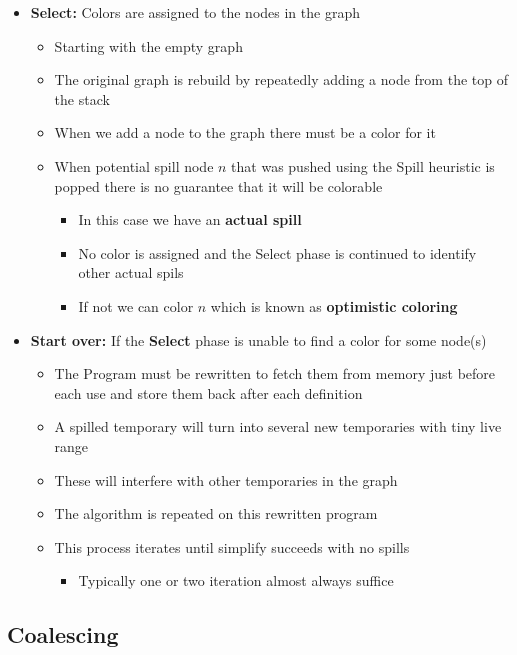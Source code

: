 \documentclass[11pt]{article}
\begin{document}
\begin{itemize}
\begin{itemize}
\item \textbf{Select:} Colors are assigned to the nodes in the graph
\begin{itemize}
\item Starting with the empty graph
\item The original graph is rebuild by repeatedly adding a node from the top of the stack
\item When we add a node to the graph there must be a color for it
\item When potential spill node \(n\) that was pushed using the Spill heuristic is popped there is no guarantee that it will be colorable
\begin{itemize}
\item In this case we have an \textbf{actual spill}
\item No color is assigned and the Select phase is continued to identify other actual spils
\item If not we can color \(n\) which is known as \textbf{optimistic coloring}
\end{itemize}
\end{itemize}

\item \textbf{Start over:} If the \textbf{Select} phase is unable to find a color for some node(s) 
\begin{itemize}
\item The Program must be rewritten to fetch them from memory just before each use and store them back after each definition
\item A spilled temporary will turn into several new temporaries with tiny live range
\item These will interfere with other temporaries in the graph
\item The algorithm is repeated on this rewritten program
\item This process iterates until simplify succeeds with no spills
\begin{itemize}
\item Typically one or two iteration almost always suffice
\end{itemize}
\end{itemize}
\end{itemize}
\end{itemize}

\subsection{Coalescing}
\label{sec:org95e207b}
\end{document}
